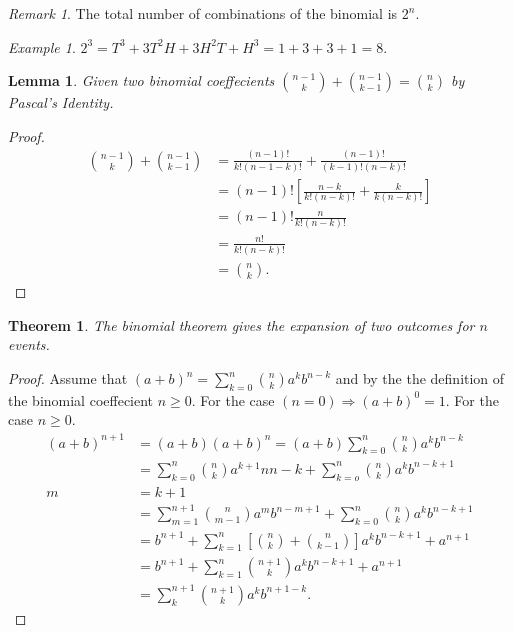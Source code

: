 \documentclass{article}
\theoremstyle{plain}
\newtheorem{lemma}{Lemma}
\newtheorem{theorem}{Theorem}
\theoremstyle{definition}
\theoremstyle{remark}
\newtheorem{remark}{Remark}
\newtheorem{example}{Example}
\begin{document}
\begin{remark}
  The total number of combinations of the binomial is $2^n$.
\end{remark}
\begin{example}
$2^3 = T^3 + 3T^2H + 3H^2T + H^3 = 1 + 3 + 3 + 1 = 8$.
\end{example}
\begin{lemma}
  Given two binomial coeffecients $\binom{n-1}{k} + \binom{n-1}{k-1} = \binom{n}{k}$ by Pascal's Identity.
\end{lemma}
\begin{proof}
  \begin{align*}
    \binom{n - 1}{k} + \binom{n - 1}{k - 1} &= \frac{(n-1)!}{k!(n - 1 - k)!} + \frac{(n - 1)!}{(k-1)!(n-k)!} \\
    &= (n - 1)![\frac{n-k}{k!(n-k)!} + \frac{k}{k(n-k)!}] \\
    &= (n - 1)!\frac{n}{k!(n-k)!} \\
    &= \frac{n!}{k!(n - k)!} \\
    &= \binom{n}{k}.
  \end{align*}
\end{proof}
\begin{theorem}
The binomial theorem gives the expansion of two outcomes for $n$ events.
\end{theorem}
\begin{proof}
  Assume that $(a + b)^n = \sum_{k=0}^{n} \binom{n}{k} a^kb^{n-k}$ and by the the definition of the binomial coeffecient $n \geq 0$. For the case $(n = 0) \Rightarrow (a + b)^0 = 1$. For the case $n \ge 0$.
  \begin{align*}
    (a + b)^{n+1} &= (a + b)(a + b)^n = (a+b)\sum_{k=0}^{n}\binom{n}{k}a^kb^{n-k} \\
                  &= \sum^{n}_{k=0}\binom{n}{k}a^{k+1}n{n-k} + \sum^{n}_{k=o}\binom{n}{k}a^{k}b^{n-k+1} \\
    m &= k + 1 \\
                  &= \sum^{n+1}_{m=1}\binom{n}{m-1}a^{m}b^{n-m+1}+\sum^{n}_{k=0}\binom{n}{k}a^{k}b^{n-k+1} \\
                  &= b^{n+1}+\sum^{n}_{k=1}[\binom{n}{k} + \binom{n}{k-1}]a^kb^{n-k+1}+a^{n+1}\\
                  &= b^{n+1}+\sum^{n}_{k=1}\binom{n+1}{k}a^{k}b^{n-k+1}+a^{n+1} \\
                  &= \sum^{n+1}_{k}\binom{n+1}{k}a^{k}b^{n+1-k}.
  \end{align*}
\end{proof}
\end{document}
